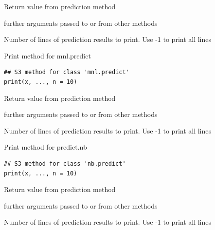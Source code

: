 \documentclass[a4paper]{book}
\begin{document}
%
\begin{Arguments}
\begin{ldescription}
\item[\code{x}] Return value from prediction method

\item[\code{...}] further arguments passed to or from other methods

\item[\code{n}] Number of lines of prediction results to print. Use -1 to print all lines
\end{ldescription}
\end{Arguments}
%
\begin{Description}
Print method for mnl.predict
\end{Description}
%
\begin{Usage}
\begin{verbatim}
## S3 method for class 'mnl.predict'
print(x, ..., n = 10)
\end{verbatim}
\end{Usage}
%
\begin{Arguments}
\begin{ldescription}
\item[\code{x}] Return value from prediction method

\item[\code{...}] further arguments passed to or from other methods

\item[\code{n}] Number of lines of prediction results to print. Use -1 to print all lines
\end{ldescription}
\end{Arguments}
%
\begin{Description}
Print method for predict.nb
\end{Description}
%
\begin{Usage}
\begin{verbatim}
## S3 method for class 'nb.predict'
print(x, ..., n = 10)
\end{verbatim}
\end{Usage}
%
\begin{Arguments}
\begin{ldescription}
\item[\code{x}] Return value from prediction method

\item[\code{...}] further arguments passed to or from other methods

\item[\code{n}] Number of lines of prediction results to print. Use -1 to print all lines
\end{ldescription}
\end{Arguments}
\end{document}
